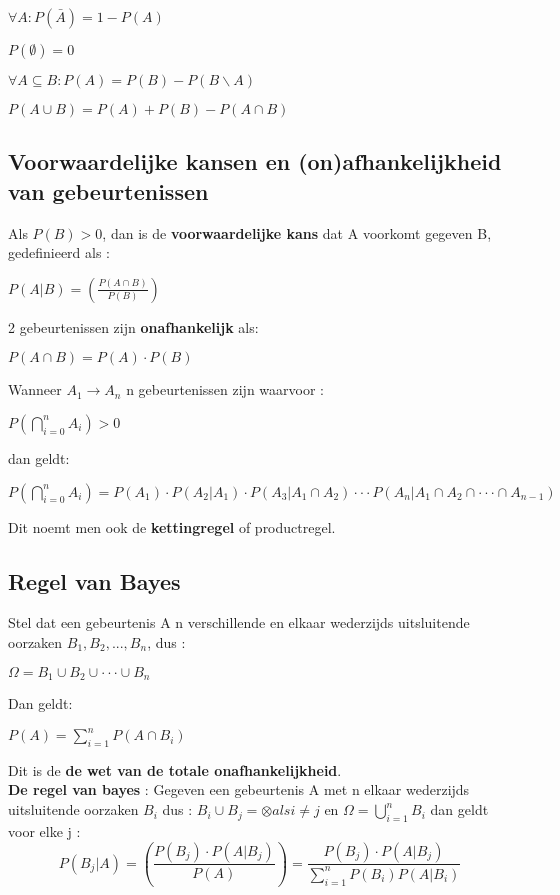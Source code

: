 \documentclass{report}
\begin{document}
	  					 \begin{center}
	  						$\forall A : P(\bar{A}) = 1 - P(A)$
	  						\end{center}
  						 \begin{center}
  							$P(\emptyset) = 0$
  						\end{center}
	  					 \begin{center}
	  						$\forall A \subseteq B : P(A) = P(B) -  P(B \backslash A)$
	  					\end{center}
  						 \begin{center}
  							$P(A \cup B) = P(A) + P(B) - P(A \cap B)$
  						\end{center}
  				\pagebreak
  				\subsection{Voorwaardelijke kansen en (on)afhankelijkheid van gebeurtenissen}
  					Als $P(B) > 0$, dan is de \textbf{voorwaardelijke kans} dat A voorkomt gegeven B, gedefinieerd als : 
  					\begin{center}
  						$P(A|B) = (\frac{P(A\cap B)}{P(B)})$
  					\end{center}
	  			2 gebeurtenissen zijn \textbf{onafhankelijk} als: 
	  			\begin{center}
	  				$P(A\cap B) = P(A) \cdot P(B)$
	  			\end{center}
  				Wanneer $A_1 \longrightarrow A_n$ n gebeurtenissen zijn waarvoor :
  				\begin{center}
  					$P(\bigcap_{i=0}^n A_i) > 0$
  				\end{center}
  				dan geldt: 
  				\begin{center}
  					$P(\bigcap_{i=0}^n A_i) = P(A_1) \cdot P(A_2 | A_1)\cdot P(A_3 | A_1 \cap A_2) \cdot \cdot \cdot P(A_n | A_1 \cap A_2 \cap \cdot \cdot \cdot \cap A_{n-1})$
  				\end{center}
  				Dit noemt men ook de \textbf{kettingregel} of productregel.
  			\subsection{Regel van Bayes}
  			Stel dat een gebeurtenis A n verschillende en elkaar wederzijds uitsluitende oorzaken $B_1, B_2, ..., B_n$, dus : 
  			\begin{center}
  				$\Omega = B_1 \cup B_2 \cup \cdot \cdot \cdot \cup B_n$
  			\end{center}  				
  			Dan geldt: 
  			\begin{center}
  				$P(A) = \sum_{i = 1}^n P(A \cap B_i)$
  			\end{center}
  			Dit is de \textbf{de wet van de totale onafhankelijkheid}. 
  			\\
  			\textbf{De regel van bayes} : Gegeven een gebeurtenis A met n elkaar wederzijds uitsluitende oorzaken $B_i$ dus : $B_i \cup B_j = \otimes als i \neq j$ en $\Omega = \bigcup_{i = 1}^n B_i$ dan geldt voor elke j : 
  				\[P(B_j | A) =  \left (\frac{P(B_j) \cdot P(A | B_j)}{P(A)} \right) = \frac{P(B_j) \cdot P(A | B_j)}{\sum_{i=1}^{n}P(B_i) P(A|B_i)}\]
\end{document}
